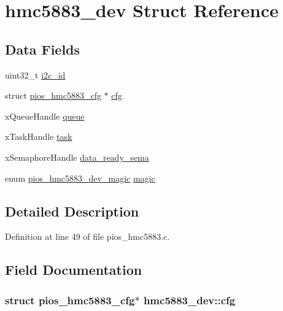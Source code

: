\hypertarget{structhmc5883__dev}{\section{hmc5883\-\_\-dev \-Struct \-Reference}
\label{structhmc5883__dev}
}
\subsection*{\-Data \-Fields}
\begin{DoxyCompactItemize}
\item 
uint32\-\_\-t \hyperlink{structhmc5883__dev_aebf7ac3174874aa4322f25c242c96cbc}{i2c\-\_\-id}
\item 
struct \hyperlink{structpios__hmc5883__cfg}{pios\-\_\-hmc5883\-\_\-cfg} $\ast$ \hyperlink{structhmc5883__dev_a65908df946905ff14183243b01690ecf}{cfg}
\item 
x\-Queue\-Handle \hyperlink{structhmc5883__dev_adc55a1a3ea4c43196bf7c411309485ac}{queue}
\item 
x\-Task\-Handle \hyperlink{structhmc5883__dev_a1e212c4df92f634246a79adcba32a4cf}{task}
\item 
x\-Semaphore\-Handle \hyperlink{structhmc5883__dev_a391988bf3eb9db5a73d9c8db759b1cff}{data\-\_\-ready\-\_\-sema}
\item 
enum \hyperlink{group___p_i_o_s___h_m_c5883_ga694f4a1224c19ea7205e8865132bc4c8}{pios\-\_\-hmc5883\-\_\-dev\-\_\-magic} \hyperlink{structhmc5883__dev_a035551dfd62138e07853dd71dfc252c4}{magic}
\end{DoxyCompactItemize}


\subsection{\-Detailed \-Description}


\-Definition at line 49 of file pios\-\_\-hmc5883.\-c.



\subsection{\-Field \-Documentation}
\hypertarget{structhmc5883__dev_a65908df946905ff14183243b01690ecf}{
\subsubsection[{cfg}]{\setlength{\rightskip}{0pt plus 5cm}struct {\bf pios\-\_\-hmc5883\-\_\-cfg}$\ast$ {\bf hmc5883\-\_\-dev\-::cfg}}}\label{structhmc5883__dev_a65908df946905ff14183243b01690ecf}



